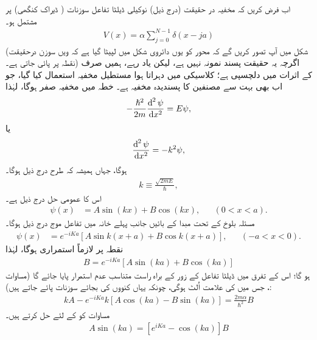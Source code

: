 اب فرض کریں کہ مخفیہ در حقیقت (درج ذیل) نوکیلی ڈیلٹا تفاعل سوزنات ( ڈیراک کنگھی) پر مشتمل ہو۔
\begin{align}\label{مساوات_متماثل_کنگھی}
	V(x) = \alpha\sum_{j=0}^{N-1}\delta(x-ja)
\end{align}
(شکل  میں آپ تصور کریں گے کہ محور  کو یوں دائروی شکل میں لپیٹا گیا ہے کہ ویں سوزن درحقیقت نقطہ  پر پائی جاتی ہے۔) اگرچہ یہ حقیقت پسند نمونہ نہیں ہے، لیکن یاد رہے، ہمیں صرف  کے اثرات میں دلچسپی ہے؛ کلاسیکی  میں دہراتا ہوا مستطیل مخفیہ استعمال کیا گیا، جو اب بھی بہت سے مصنفین کا پسندیدہ مخفیہ ہے۔ خطہ  میں مخفیہ صفر ہوگا، لہٰذا 
\begin{align*}
	-\frac{\hslash^{2}}{2m}\frac{\dif^{\,2}\psi}{\dif x^{2}} = E\psi,
\end{align*}
یا
\begin{align*}
	\frac{\dif^{\,2}\psi}{\dif x^{2}} = -k^{2}\psi,
\end{align*}
ہوگا، جہاں ہمیشہ کہ طرح درج ذیل ہوگا۔
\begin{align}
	k \equiv \frac{\sqrt{2mE}}{\hslash},
\end{align}
اس کا عمومی حل درج ذیل ہے۔
\begin{align}\label{مساوات_متماثل_عمومی_حل_بلوخ_الف}
	\psi(x) &= A\sin(kx) + B\cos(kx), &&(0<x<a).
\end{align}
مسئلہ بلوخ کے تحت مبدا کے بائیں جانب پہلے خانہ میں تفاعل موج درج ذیل ہوگا۔ 
\begin{align}\label{مساوات_متماثل_عمومی_حل_بلوخ_ب}
	\psi(x) &= e^{-iKa}[A\sin k(x+a) + B\cos k(x+a)], &&(-a<x<0). 
\end{align}
نقطہ پر  لازماً استمراری ہوگا، لہٰذا 
\begin{align}\label{مساوات_متماثل_استمراری_بلوخ}
	B = e^{-iKa}[A\sin(ka) + B\cos(ka)]
\end{align}
ہو گا؛ اس کے تفرق میں ڈیلٹا تفاعل کے زور کے براہ راست متناسب عدم استمرار پایا جائے گا (مساوات ، جس میں  کی علامت اُلٹ ہوگی، چونکہ یہاں کنووں کی بجائے سوزنات پائے جاتے ہیں):
\begin{align}\label{مساوات_متماثل_عدم_استمرار_بلوخ}
	kA - e^{-iKa}k[A\cos(ka) - B\sin(ka)] = \frac{2m\alpha}{\hslash^{2}}B
\end{align}
مساوات  کو  کے لئے حل کرتے ہیں۔
\begin{align}\label{مساوات_متماثل_عمومی_حل_بلوخ_پ}
	A\sin(ka) = [e^{iKa}-\cos(ka)]B
\end{align}
